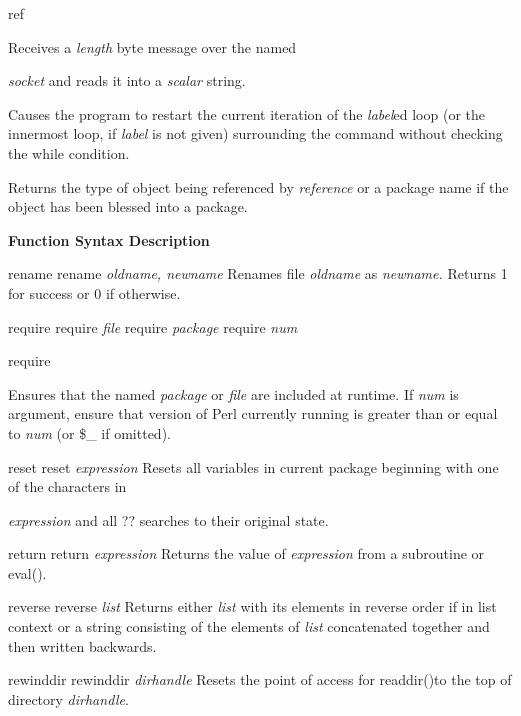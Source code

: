 \documentclass[a4paper,11pt]{book}
\begin{document}
\noindent ref

\noindent 

\noindent Receives a \textit{length }byte message over the named

\noindent \textit{socket }and reads it into a \textit{scalar }string.

\noindent 

\noindent Causes the program to restart the current iteration of the \textit{label}ed loop (or the innermost loop, if \textit{label }is not given) surrounding the command without checking the while condition.

\noindent 

\noindent Returns the type of object being referenced by \textit{reference }or a package name if the object has been blessed into a package.

\noindent 

\noindent 

\noindent 

\noindent \textbf{Function Syntax Description}

\noindent 

\noindent rename rename \textit{oldname, newname }Renames file \textit{oldname }as \textit{newname. }Returns 1 for success or 0 if otherwise.

\noindent require require \textit{file }require \textit{package }require \textit{num}

\noindent require

\noindent 

\noindent Ensures that the named \textit{package }or \textit{file }are included at runtime. If \textit{num }is argument, ensure that version of Perl currently running is greater than or equal to \textit{num }(or \$\_ if omitted).

\noindent reset reset \textit{expression }Resets all variables in current package beginning with one of the characters in

\noindent \textit{expression }and all ?? searches to their original state.

\noindent return return \textit{expression }Returns the value of \textit{expression }from a subroutine or eval().

\noindent reverse reverse \textit{list }Returns either \textit{list }with its elements in reverse order if in list context or a string consisting of the elements of \textit{list }concatenated together and then written backwards.

\noindent rewinddir rewinddir \textit{dirhandle }Resets the point of access for readdir()to the top of directory \textit{dirhandle}.
\end{document}
